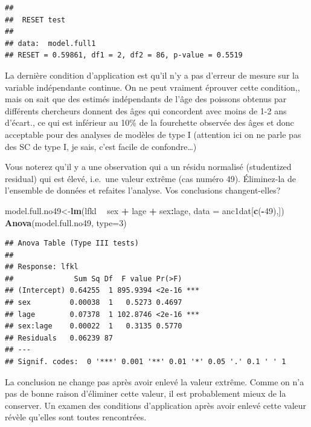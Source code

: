 \documentclass[12pt,]{book}
\newenvironment{Shaded}{\begin{snugshade}}{\end{snugshade}}
\newcommand{\DataTypeTok}[1]{\textcolor[rgb]{0.13,0.29,0.53}{#1}}
\newcommand{\DecValTok}[1]{\textcolor[rgb]{0.00,0.00,0.81}{#1}}
\newcommand{\KeywordTok}[1]{\textcolor[rgb]{0.13,0.29,0.53}{\textbf{#1}}}
\newcommand{\NormalTok}[1]{#1}
\newcommand{\OperatorTok}[1]{\textcolor[rgb]{0.81,0.36,0.00}{\textbf{#1}}}
\newcommand{\StringTok}[1]{\textcolor[rgb]{0.31,0.60,0.02}{#1}}
\begin{document}
\begin{verbatim}
## 
##  RESET test
## 
## data:  model.full1
## RESET = 0.59861, df1 = 2, df2 = 86, p-value = 0.5519
\end{verbatim}

La dernière condition d'application est qu'il n'y a pas d'erreur de mesure sur la variable indépendante continue. On ne peut vraiment éprouver cette condition,, mais on sait que des estimés indépendants de l'âge des poissons obtenus par différents chercheurs donnent des âges qui concordent avec moins de 1-2 ans d'écart., ce qui est inférieur au 10\% de la fourchette observée des âges et donc acceptable pour des analyses de modèles de type I (attention ici on ne parle pas des SC de type I, je sais, c'est facile de confondre\ldots{})

Vous noterez qu'il y a une observation qui a un résidu normalisé (studentized residual) qui est élevé, i.e.~une valeur extrême (cas numéro 49). Éliminez-la de l'ensemble de données et refaites l'analyse. Vos conclusions changent-elles?

\begin{Shaded}
\begin{Highlighting}[]
\NormalTok{model.full.no49<-}\KeywordTok{lm}\NormalTok{(lfkl }\OperatorTok{~}\StringTok{ }\NormalTok{sex }\OperatorTok{+}\StringTok{ }\NormalTok{lage }\OperatorTok{+}\StringTok{ }\NormalTok{sex}\OperatorTok{:}\NormalTok{lage, }\DataTypeTok{data =}\NormalTok{ anc1dat[}\KeywordTok{c}\NormalTok{(}\OperatorTok{-}\DecValTok{49}\NormalTok{),])}
\KeywordTok{Anova}\NormalTok{(model.full.no49, }\DataTypeTok{type=}\DecValTok{3}\NormalTok{)}
\end{Highlighting}
\end{Shaded}

\begin{verbatim}
## Anova Table (Type III tests)
## 
## Response: lfkl
##              Sum Sq Df  F value Pr(>F)    
## (Intercept) 0.64255  1 895.9394 <2e-16 ***
## sex         0.00038  1   0.5273 0.4697    
## lage        0.07378  1 102.8746 <2e-16 ***
## sex:lage    0.00022  1   0.3135 0.5770    
## Residuals   0.06239 87                    
## ---
## Signif. codes:  0 '***' 0.001 '**' 0.01 '*' 0.05 '.' 0.1 ' ' 1
\end{verbatim}

La conclusion ne change pas après avoir enlevé la valeur extrême. Comme on n'a pas de bonne raison d'éliminer cette valeur, il est probablement mieux de la conserver. Un examen des conditions d'application après avoir enlevé cette valeur révèle qu'elles sont toutes rencontrées.
\end{document}
